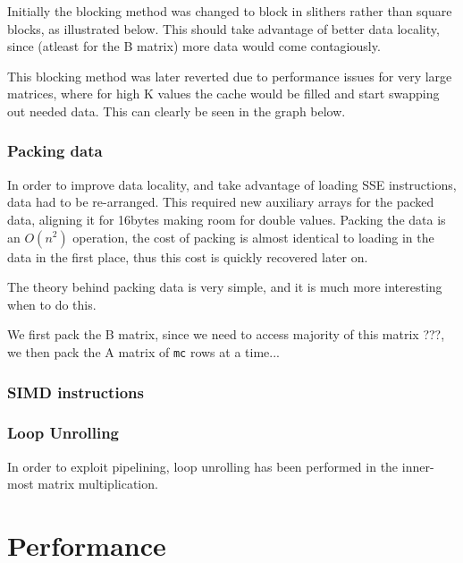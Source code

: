 \documentclass[a4paper,11pt,oneside]{book}
\begin{document}
Initially the blocking method was changed to block in slithers rather than square blocks, as illustrated below. This should take advantage of better data locality, since (atleast for the B matrix) more data would come contagiously.


This blocking method was later reverted due to performance issues for very large matrices, where for high K values the cache would be filled and start swapping out needed data. This can clearly be seen in the graph below.


\subsection{Packing data}
In order to improve data locality, and take advantage of loading SSE instructions, data had to be re-arranged. This required new auxiliary arrays for the packed data, aligning it for 16bytes making room for double values. Packing the data is an $O(n^2)$ operation, the cost of packing is almost identical to loading in the data in the first place, thus this cost is quickly recovered later on.

The theory behind packing data is very simple, and it is much more interesting when to do this. 

We first pack the B matrix, since we need to access majority of this matrix ???, we then pack the A matrix of \verb!mc! rows at a time... %

\subsection{SIMD instructions}

\subsection{Loop Unrolling}
In order to exploit pipelining, loop unrolling has been performed in the inner-most matrix multiplication.

\chapter{Performance}

\end{document}
